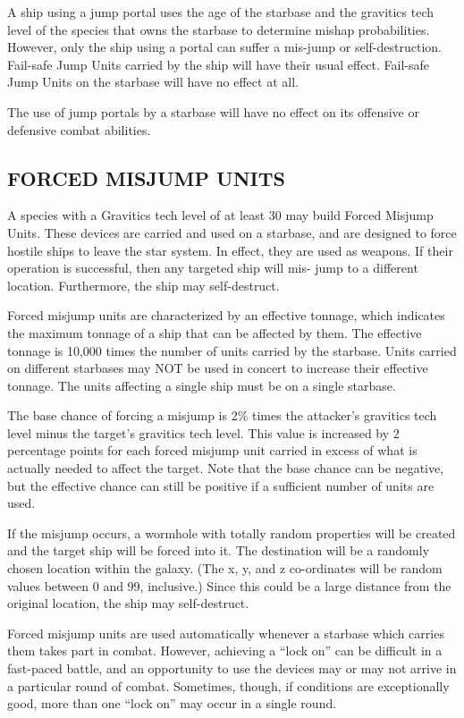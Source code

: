 \documentclass[10pt,titlepage]{article}
\begin{document}
A ship using a jump portal uses the age of the starbase and the gravitics
tech level of the species that owns the starbase to determine mishap
probabilities.  However, only the ship using a portal can suffer a mis-jump
or self-destruction.  Fail-safe Jump Units carried by the ship will have
their usual effect.  Fail-safe Jump Units on the starbase will have no
effect at all.

The use of jump portals by a starbase will have no effect on its offensive or
defensive combat abilities.

\subsection{FORCED MISJUMP UNITS}

A species with a Gravitics tech level of at least 30 may build Forced Misjump
Units.  These devices are carried and used on a starbase, and are designed to
force hostile ships to leave the star system.  In effect, they are used as
weapons.  If their operation is successful, then any targeted ship will mis-
jump to a different location.  Furthermore, the ship may self-destruct.

Forced misjump units are characterized by an effective tonnage, which indicates
the maximum tonnage of a ship that can be affected by them.  The effective
tonnage is 10,000 times the number of units carried by the starbase.  Units
carried on different starbases may NOT be used in concert to increase their
effective tonnage.  The units affecting a single ship must be on a single
starbase.

The base chance of forcing a misjump is 2\% times the attacker's gravitics tech
level minus the target's gravitics tech level.  This value is increased by 2
percentage points for each forced misjump unit carried in excess of what is
actually needed to affect the target.  Note that the base chance can be
negative, but the effective chance can still be positive if a sufficient
number of units are used.

If the misjump occurs, a wormhole with totally random properties will be
created and the target ship will be forced into it.  The destination will be
a randomly chosen location within the galaxy.  (The x, y, and z co-ordinates
will be random values between 0 and 99, inclusive.)  Since this could be a
large distance from the original location, the ship may self-destruct.

Forced misjump units are used automatically whenever a starbase which carries
them takes part in combat.  However, achieving a ``lock on'' can be difficult
in a fast-paced battle, and an opportunity to use the devices may or may not
arrive in a particular round of combat.  Sometimes, though, if conditions are
exceptionally good, more than one ``lock on'' may occur in a single round.
\end{document}
